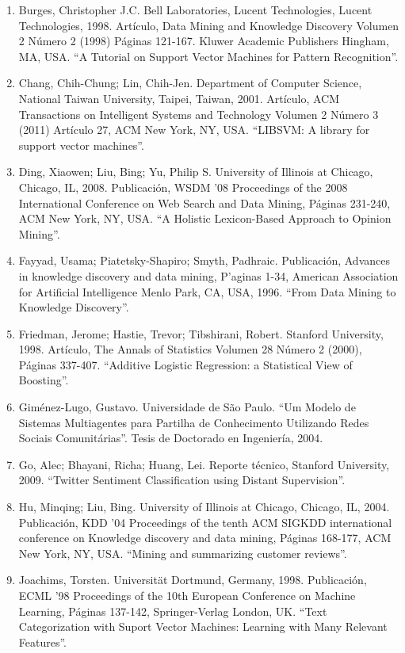 \begin{enumerate}
\item Burges, Christopher J.C. Bell Laboratories, Lucent Technologies, Lucent Technologies, 1998. Art\'iculo, Data Mining and Knowledge Discovery Volumen 2 N\'umero 2 (1998) P\'aginas 121-167. Kluwer Academic Publishers Hingham, MA, USA. ``A Tutorial on Support Vector Machines for Pattern Recognition''.
\item Chang, Chih-Chung; Lin, Chih-Jen. Department of Computer Science, National Taiwan University, Taipei, Taiwan, 2001. Art\'iculo, ACM Transactions on Intelligent Systems and Technology Volumen 2 N\'umero 3 (2011) Art\'iculo 27, ACM New York, NY, USA. ``LIBSVM: A library for support vector machines''. 
\item Ding, Xiaowen; Liu, Bing; Yu, Philip S. University of Illinois at Chicago, Chicago, IL, 2008. Publicaci\'on, WSDM '08 Proceedings of the 2008 International Conference on Web Search and Data Mining, P\'aginas 231-240, ACM New York, NY, USA. ``A Holistic Lexicon-Based Approach to Opinion Mining''.
\item Fayyad, Usama; Piatetsky-Shapiro; Smyth, Padhraic. Publicaci\'on, Advances in knowledge discovery and data mining, P'aginas 1-34, American Association for Artificial Intelligence Menlo Park, CA, USA, 1996. ``From Data Mining to Knowledge Discovery''.
\item Friedman, Jerome; Hastie, Trevor; Tibshirani, Robert. Stanford University, 1998. Art\'iculo, The Annals of Statistics Volumen 28 N\'umero 2 (2000), P\'aginas 337-407. ``Additive Logistic Regression: a Statistical View of Boosting''.
\item Gim\'enez-Lugo, Gustavo. Universidade de S\~ao Paulo. ``Um Modelo de Sistemas Multiagentes para Partilha de Conhecimento Utilizando Redes Sociais Comunit\'arias''. Tesis de Doctorado en Ingenier\'ia, 2004.
\item Go, Alec; Bhayani, Richa; Huang, Lei. Reporte t\'ecnico, Stanford University, 2009. ``Twitter Sentiment Classification using Distant Supervision''.
\item Hu, Minqing; Liu, Bing. University of Illinois at Chicago, Chicago, IL, 2004. Publicaci\'on, KDD '04 Proceedings of the tenth ACM SIGKDD international conference on Knowledge discovery and data mining, P\'aginas 168-177, ACM New York, NY, USA. ``Mining and summarizing customer reviews''.
\item Joachims, Torsten. Universit\"at Dortmund, Germany, 1998. Publicaci\'on, ECML '98 Proceedings of the 10th European Conference on Machine Learning, P\'aginas 137-142, Springer-Verlag London, UK. ``Text Categorization with Suport Vector Machines: Learning with Many Relevant Features''.

\end{enumerate}
